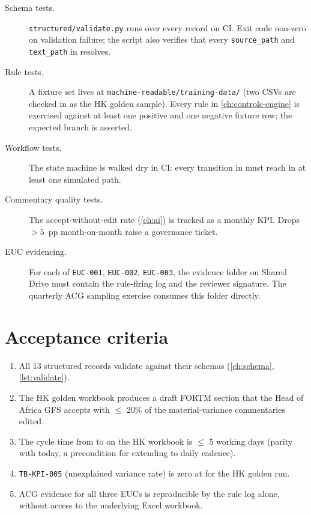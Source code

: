 \begin{description}
  \item[Schema tests.] \corpus\texttt{structured/validate.py} runs
        over every record on CI. Exit code non-zero on validation
        failure; the script also verifies that every \texttt{source\_path}
        and \texttt{text\_path} in  resolves.
  \item[Rule tests.] A fixture set lives at
        \corpus\texttt{machine-readable/training-data/} (two CSVs are
        checked in as the HK golden sample). Every rule in
        \cref{ch:controls-engine} is exercised against at least one
        positive and one negative fixture row; the expected branch is
        asserted.
  \item[Workflow tests.] The state machine is walked dry in CI: every
        transition in  must reach
         in at least one simulated path.
  \item[Commentary quality tests.] The accept-without-edit rate
        (\cref{ch:ai}) is tracked as a monthly KPI. Drops $> 5$~pp
        month-on-month raise a governance ticket.
  \item[EUC evidencing.] For each of \texttt{EUC-001}, \texttt{EUC-002},
        \texttt{EUC-003}, the evidence folder on Shared Drive must
        contain the rule-firing log and the reviewer signature. The
        quarterly ACG sampling exercise consumes this folder directly.
\end{description}

\section{Acceptance criteria}

\begin{enumerate}
  \item All 13 structured records validate against their schemas
        (\cref{ch:schema}, \cref{lst:validate}).
  \item The HK golden workbook produces a draft FORTM section that
        the Head of Africa GFS accepts with $\le$ 20\% of the
        material-variance commentaries edited.
  \item The cycle time from  to
         on the HK workbook is $\le$ 5 working
        days (parity with today, a precondition for extending to daily
        cadence).
  \item \texttt{TB-KPI-005} (unexplained variance rate) is zero at
         for the HK golden run.
  \item ACG evidence for all three EUCs is reproducible by the rule
        log alone, without access to the underlying Excel workbook.
\end{enumerate}

